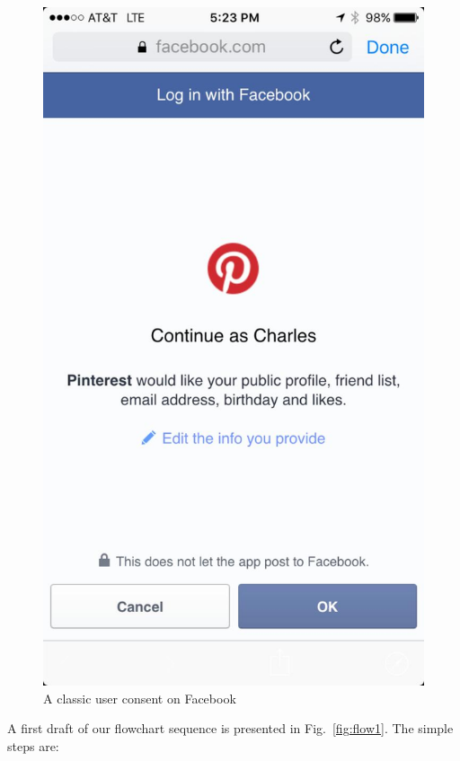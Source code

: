 \vspace{0.5cm}
\begin{figure}[htbp]
    \centering
    \includegraphics[scale=0.45]{chapters/images/chp2/desktopaccess1.jpg}
    \caption{A classic user consent on Facebook}
    \label{fig:usercon1}
\end{figure}

A first draft of our flowchart sequence is presented in Fig.~\ref{fig:flow1}. The simple steps are:

